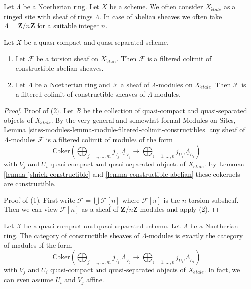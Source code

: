 \noindent
Let $\Lambda$ be a Noetherian ring. Let $X$ be a scheme.
We often consider $X_{\acute{e}tale}$ as a ringed site with
sheaf of rings $\underline{\Lambda}$. In case of abelian sheaves
we often take $\Lambda = \mathbf{Z}/n\mathbf{Z}$ for a suitable
integer $n$.

\begin{lemma}
\label{lemma-torsion-colimit-constructible}
Let $X$ be a quasi-compact and quasi-separated scheme.
\begin{enumerate}
\item Let $\mathcal{F}$ be a torsion sheaf on $X_{\acute{e}tale}$.
Then $\mathcal{F}$ is a filtered colimit of constructible abelian sheaves.
\item Let $\Lambda$ be a Noetherian ring and $\mathcal{F}$ a sheaf
of $\Lambda$-modules on $X_{\acute{e}tale}$. Then
$\mathcal{F}$ is a filtered colimit of constructible sheaves of
$\Lambda$-modules.
\end{enumerate}
\end{lemma}

\begin{proof}
Proof of (2). Let $\mathcal{B}$ be the collection of quasi-compact
and quasi-separated objects of $X_{\acute{e}tale}$. By the very general
and somewhat formal Modules on Sites,
Lemma \ref{sites-modules-lemma-module-filtered-colimit-constructibles}
any sheaf of $\Lambda$-modules $\mathcal{F}$ is a filtered colimit
of modules of the form
$$
\text{Coker}\left(
\bigoplus\nolimits_{j = 1, \ldots, m} j_{V_j!}\underline{\Lambda}_{V_j}
\longrightarrow
\bigoplus\nolimits_{i = 1, \ldots, n} j_{U_i!}\underline{\Lambda}_{U_i}
\right)
$$
with $V_j$ and $U_i$ quasi-compact and quasi-separated objects
of $X_{\acute{e}tale}$. By
Lemmas \ref{lemma-jshriek-constructible} and \ref{lemma-constructible-abelian}
these cokernels are constructible.

\medskip\noindent
Proof of (1). First write $\mathcal{F} = \bigcup \mathcal{F}[n]$ where
$\mathcal{F}[n]$ is the $n$-torsion subsheaf. Then we can view
$\mathcal{F}[n]$ as a sheaf of $\mathbf{Z}/n\mathbf{Z}$-modules
and apply (2).
\end{proof}

\begin{proposition}
\label{proposition-category-constructible}
Let $X$ be a quasi-compact and quasi-separated scheme. Let $\Lambda$
be a Noetherian ring. The category of constructible sheaves of
$\Lambda$-modules is exactly the category of modules of the form
$$
\text{Coker}\left(
\bigoplus\nolimits_{j = 1, \ldots, m} j_{V_j!}\underline{\Lambda}_{V_j}
\longrightarrow
\bigoplus\nolimits_{i = 1, \ldots, n} j_{U_i!}\underline{\Lambda}_{U_i}
\right)
$$
with $V_j$ and $U_i$ quasi-compact and quasi-separated objects of
$X_{\acute{e}tale}$. In fact, we can even assume $U_i$ and $V_j$ affine.
\end{proposition}

